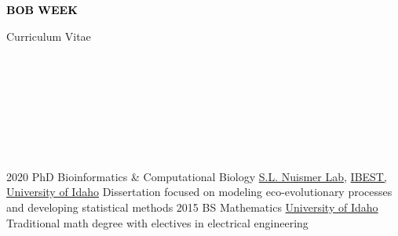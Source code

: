 \documentclass[9pt]{developercv} %
\begin{document}

\begin{minipage}[t]{0.5\textwidth} 
	\vspace{-\baselineskip} %
	
	{ \fontsize{16}{20} \textcolor{black}{\textbf{\MakeUppercase{Bob Week}}}} %
	
	\vspace{6pt}
	
	{\Large Curriculum Vitae} %
\end{minipage}
\hfill
\begin{minipage}[t]{0.2\textwidth} %
	\vspace{-\baselineskip} %
	
	\\
    \\
    \\
	
\end{minipage}
\begin{minipage}[t]{0.27\textwidth} %
	\vspace{-\baselineskip} %
	
	\\
    \\
    \\
\end{minipage}

\vspace{-10 pt}
\begin{entrylist}
    \entry
		{2020}
		{PhD Bioinformatics \& Computational Biology}
		{\href{https://www.leeef.org/}{S.L. Nuismer Lab}, \href{https://www.iids.uidaho.edu/about.php}{IBEST, University of Idaho}}
		{Dissertation focused on modeling eco-evolutionary processes and developing statistical methods}
    \entry
		{2015}
		{BS Mathematics}
		{\href{https://www.uidaho.edu/sci/mathstat}{University of Idaho}}
		{Traditional math degree with electives in electrical engineering}
\end{entrylist}
\end{document}
